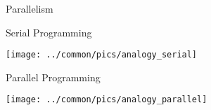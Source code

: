 \begin{frame}
  \begin{block}{Parallelism}\pause
    \begin{center}
    \begin{minipage}{.46\textwidth}
    \begin{block}{Serial Programming}
      \begin{center}
      \texttt{[image: ../common/pics/analogy\_serial]}
      \end{center}
      \end{block}
    \end{minipage}
    \hspace{.15cm}
    \begin{minipage}{.46\textwidth}
    \begin{block}{Parallel Programming}
      \begin{center}
      
\texttt{[image: ../common/pics/analogy\_parallel]}
      \end{center}
      \end{block}
    \end{minipage}
    \end{center}
  \end{block}
\end{frame}




  
